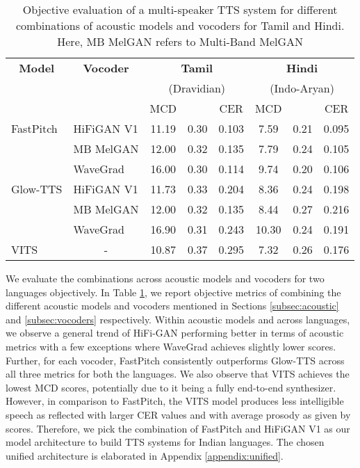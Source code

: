 \documentclass{article}
\begin{document}
\begin{table}[htp]
\centering
\begingroup
\setlength{\tabcolsep}{2pt} \renewcommand{\arraystretch}{1} \begin{tabular}{@{}llcclccl@{}}
\toprule
\multicolumn{1}{c}{\textbf{Model}} & \multicolumn{1}{c}{\textbf{Vocoder}} & \multicolumn{3}{c}{\textbf{Tamil }}                                                & \multicolumn{3}{c}{\textbf{Hindi}}       \\ 
\multicolumn{1}{c}{} & \multicolumn{1}{c}{} & \multicolumn{3}{c}{(Dravidian)}                                                & \multicolumn{3}{c}{(Indo-Aryan)} \\ 
 \cmidrule(l){3-5} \cmidrule(l){6-8}
                                   &                                      & MCD        & \emph{}          & \multicolumn{1}{c}{CER} & MCD        &           & \multicolumn{1}{c}{CER} \\
\midrule                                   
FastPitch  & HiFiGAN V1              & 11.19 & 0.30 & 0.103 & 7.59  & 0.21 & 0.095 \\
           & MB MelGAN      & 12.00 & 0.32 & 0.135 & 7.79  & 0.24 & 0.105 \\
           & WaveGrad              & 16.00 & 0.30 & 0.114 & 9.74  & 0.20 & 0.106 \\ \midrule
Glow-TTS   & HiFiGAN V1              & 11.73 & 0.33 & 0.204 & 8.36  & 0.24 & 0.198 \\
           & MB MelGAN      & 12.00 & 0.32 & 0.135 & 8.44  & 0.27 & 0.216\\
           & WaveGrad              & 16.90 & 0.31 & 0.243 & 10.30 & 0.24 & 0.191 \\ \midrule
VITS & \multicolumn{1}{c}{-} & 10.87 & 0.37 & 0.295 & 7.32  & 0.26 & 0.176\\  \bottomrule
\end{tabular}
\endgroup
\caption{Objective evaluation of a multi-speaker TTS system for different combinations of acoustic models and vocoders for Tamil and Hindi. Here, MB MelGAN refers to Multi-Band MelGAN}
\label{tab:combo}
\end{table}
We evaluate the combinations across acoustic models and vocoders for two languages objectively. In Table \ref{tab:combo}, we report objective metrics of combining the different acoustic models and vocoders mentioned in Sections \ref{subsec:acoustic} and \ref{subsec:vocoders} respectively. Within acoustic models and across languages, we observe a general trend of HiFi-GAN performing better in terms of acoustic metrics with a few exceptions where WaveGrad achieves slightly lower  scores. Further, for each vocoder, FastPitch consistently outperforms Glow-TTS across all three metrics for both the languages. We also observe that VITS achieves the lowest MCD scores, potentially due to it being a fully end-to-end synthesizer. However, in comparison to FastPitch, the VITS model produces less intelligible speech as reflected with larger CER values and with average prosody as given by  scores. Therefore, we pick the combination of FastPitch and HiFiGAN V1 as our model architecture  to build TTS systems for Indian languages. The chosen unified architecture  is elaborated in Appendix \ref{appendix:unified}.
\end{document}

